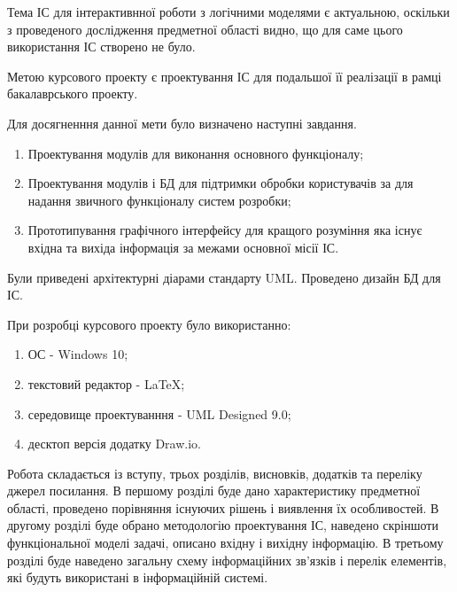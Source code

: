 
Тема ІС для інтерактивнної роботи з логічними моделями є актуальною, оскільки з проведеного дослідження предметної області видно, що для саме цього використання ІС створено не було.

Метою курсового проекту є проектування ІС для подальшої її реалізації в рамці бакалаврського проекту.

Для досягненння данної мети було визначено наступні завдання.

\begin{enumerate}
	\item Проектування модулів для виконання основного функціоналу;
	\item Проектування модулів і БД для підтримки обробки користувачів за для надання звичного функціоналу систем розробки;
	\item Прототипування графічного інтерфейсу для кращого розуміння яка існує вхідна та вихіда інформація за межами основної місії ІС.
\end{enumerate}

Були приведені архітектурні діарами стандарту UML. Проведено дизайн БД для ІС.

При розробці курсового проекту було використанно:

\begin{enumerate}
	\item ОС - Windows 10;
	\item текстовий редактор - LaTeX;
	\item середовище проектуванння  - UML Designed 9.0;
	\item десктоп версія додатку Draw.io.
\end{enumerate}

Робота складається із вступу, трьох розділів, висновків, додатків та переліку джерел посилання. В першому розділі буде дано характеристику предметної області, проведено порівняння існуючих рішень і виявлення їх особливостей. В другому розділі буде обрано методологію проектування ІС, наведено скріншоти функціональної моделі задачі, описано вхідну і вихідну інформацію. В третьому розділі буде наведено загальну схему інформаційних зв’язків і перелік елементів, які будуть використані в інформаційній системі. 
